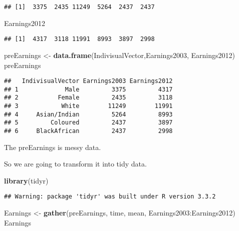 \documentclass[]{article}
\newenvironment{Shaded}{\begin{snugshade}}{\end{snugshade}}
\newcommand{\KeywordTok}[1]{\textcolor[rgb]{0.13,0.29,0.53}{\textbf{{#1}}}}
\newcommand{\StringTok}[1]{\textcolor[rgb]{0.31,0.60,0.02}{{#1}}}
\newcommand{\NormalTok}[1]{{#1}}
\begin{document}
\begin{verbatim}
## [1]  3375  2435 11249  5264  2437  2437
\end{verbatim}

\begin{Shaded}
\begin{Highlighting}[]
\NormalTok{Earnings2012}
\end{Highlighting}
\end{Shaded}

\begin{verbatim}
## [1]  4317  3118 11991  8993  3897  2998
\end{verbatim}

\begin{Shaded}
\begin{Highlighting}[]
\NormalTok{preEarnings <-}\StringTok{ }\KeywordTok{data.frame}\NormalTok{(IndivisualVector,Earnings2003, Earnings2012)}
\NormalTok{preEarnings}
\end{Highlighting}
\end{Shaded}

\begin{verbatim}
##   IndivisualVector Earnings2003 Earnings2012
## 1             Male         3375         4317
## 2           Female         2435         3118
## 3            White        11249        11991
## 4     Asian/Indian         5264         8993
## 5         Coloured         2437         3897
## 6     BlackAfrican         2437         2998
\end{verbatim}

The preEarnings is messy data.

So we are going to transform it into tidy data.

\begin{Shaded}
\begin{Highlighting}[]
\KeywordTok{library}\NormalTok{(tidyr)}
\end{Highlighting}
\end{Shaded}

\begin{verbatim}
## Warning: package 'tidyr' was built under R version 3.3.2
\end{verbatim}

\begin{Shaded}
\begin{Highlighting}[]
\NormalTok{Earnings <-}\StringTok{ }\KeywordTok{gather}\NormalTok{(preEarnings, time, mean, Earnings2003:Earnings2012)}
\NormalTok{Earnings}
\end{Highlighting}
\end{Shaded}
\end{document}
